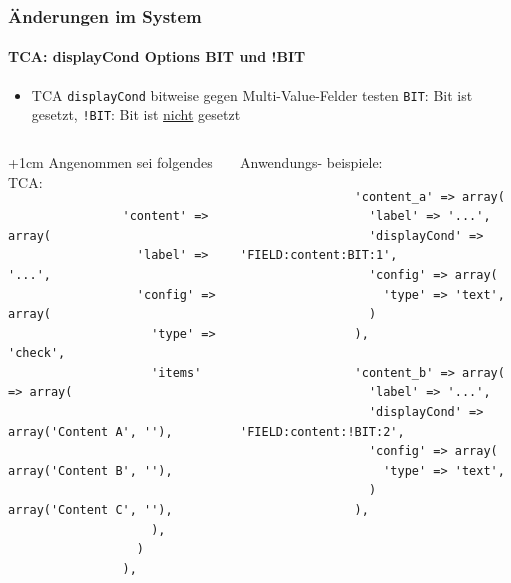 
\begin{frame}[fragile]
	\frametitle{Änderungen im System}
	\framesubtitle{TCA: displayCond Options BIT und !BIT}

	\lstset{
		basicstyle=\tiny\ttfamily
	}

	\begin{itemize}
		\item TCA \texttt{displayCond} bitweise gegen Multi-Value-Felder testen\newline
			\texttt{BIT}: Bit ist gesetzt, \texttt{!BIT}: Bit ist \underline{nicht} gesetzt
	\end{itemize}

	\begin{columns}[T]

		\begin{column}{.5\textwidth}

			\advance\leftskip+1cm
			\smaller
				Angenommen sei\newline
				folgendes TCA:
			\normalsize

			\lstset{xleftmargin=1cm}

			\begin{lstlisting}
				'content' => array(
				  'label' => '...',
				  'config' => array(
				    'type' => 'check',
				    'items' => array(
				      array('Content A', ''),
				      array('Content B', ''),
				      array('Content C', ''),
				    ),
				  )
				),
			\end{lstlisting}

		\end{column}
		\begin{column}{.5\textwidth}

			\smaller
				Anwendungs-\newline
				beispiele:
			\normalsize

			\begin{lstlisting}
				'content_a' => array(
				  'label' => '...',
				  'displayCond' => 'FIELD:content:BIT:1',
				  'config' => array(
				    'type' => 'text',
				  )
				),

				'content_b' => array(
				  'label' => '...',
				  'displayCond' => 'FIELD:content:!BIT:2',
				  'config' => array(
				    'type' => 'text',
				  )
				),
			\end{lstlisting}
		\end{column}

	\end{columns}

\end{frame}


